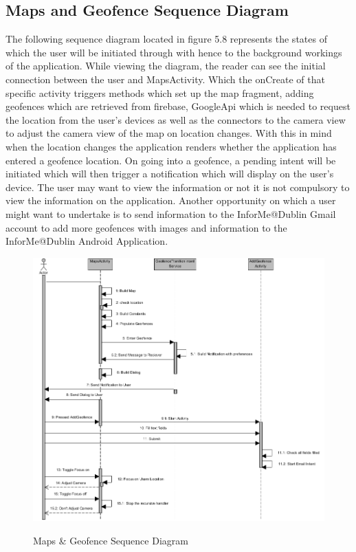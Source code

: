 \subsection{Maps and Geofence Sequence Diagram}
The following sequence diagram located in figure 5.8 represents the states of which the user will be initiated through with hence to the background workings of the application. While viewing the diagram, the reader can see the initial connection between the user and MapsActivity.  Which the onCreate of that specific activity triggers methods which set up the map fragment, adding geofences which are retrieved from firebase, GoogleApi which is needed to request the location from the user's devices as well as the connectors to the camera view to adjust the camera view of the map on location changes. With this in mind when the location changes the application renders whether the application has entered a geofence location. On going into a geofence, a pending intent will be initiated which will then trigger a notification which will display on the user's device. The user may want to view the information or not it is not compulsory to view the information on the application. Another opportunity on which a user might want to undertake is to send information to the InforMe@Dublin Gmail account to add more geofences with images and information to the InforMe@Dublin Android Application.\newpage

\begin{figure}[htbp]
    \center \includegraphics[width=400pt]{MapsSequence}\\
    \caption{Maps \& Geofence Sequence Diagram} \label{Figure: Maps & Geofence Sequence Diagram }
\end{figure}

